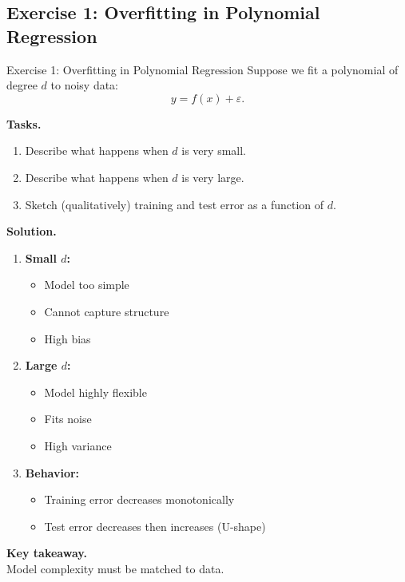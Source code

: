 \documentclass[aspectratio=169,11pt]{beamer}
\begin{document}
\subsection{Exercise 1: Overfitting in Polynomial Regression}
\begin{frame}[t,allowframebreaks]{Exercise 1: Overfitting in Polynomial Regression}
\small
Suppose we fit a polynomial of degree $d$ to noisy data:
\[
y = f(x) + \varepsilon.
\]

\textbf{Tasks.}\\ \begin{enumerate}
    \item Describe what happens when $d$ is very small.
    \item Describe what happens when $d$ is very large.
    \item Sketch (qualitatively) training and test error as a function of $d$.
\end{enumerate}

\textbf{Solution.}\\ \begin{enumerate}
\item \textbf{Small $d$:}\\ \begin{itemize}
    \item Model too simple
    \item Cannot capture structure
    \item High bias
\end{itemize}

\item \textbf{Large $d$:}\\ \begin{itemize}
    \item Model highly flexible
    \item Fits noise
    \item High variance
\end{itemize}

\item \textbf{Behavior:}\\ \begin{itemize}
    \item Training error decreases monotonically
    \item Test error decreases then increases (U-shape)
\end{itemize}
\end{enumerate}

\textbf{Key takeaway.}\\ Model complexity must be matched to data.
\end{frame}
\end{document}
